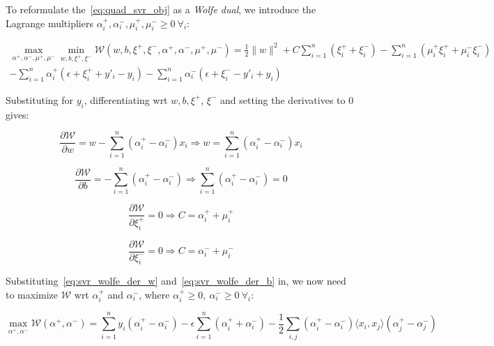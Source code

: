 To reformulate the~\eqref{eq:quad_svr_obj} as a \emph{Wolfe dual}, we introduce the Lagrange multipliers $\alpha_i^+, \alpha_i^-, \mu_i^+, \mu_i^- \geq 0 \ \forall_i$:

\begin{equation} \label{eq:svr_wolfe_dual}
	\begin{aligned}
    	\max_{\alpha^+,\alpha^-,\mu^+,\mu^-} \min_{w,b,\xi^+,\xi^-} \mathcal{W}(w,b,\xi^+,\xi^-,\alpha^+,\alpha^-,\mu^+,\mu^-) = \frac{1}{2} \| w \|^2 + C \sum_{i=1}^n (\xi_i^+ + \xi_i^-)-\sum_{i=1}^n (\mu_i^+ \xi_i^+ + \mu_i^- \xi_i^-) \\ -\sum_{i=1}^n \alpha_i^+(\epsilon+\xi_i^+ + y'_i-y_i)-\sum_{i=1}^n \alpha_i^-(\epsilon+\xi_i^- - y'_i+y_i)
	\end{aligned}
\end{equation}

Substituting for $y_i$, differentiating wrt $w, b, \xi^+$, $\xi^-$ and setting the derivatives to $0$ gives:

\begin{equation} \label{eq:svr_wolfe_der_w}
	\frac{\partial \mathcal{W}}{\partial w}=w-\sum_{i=1}^n (\alpha_i^+ - \alpha_i^-) x_i \Rightarrow w=\sum_{i=1}^n (\alpha_i^+ - \alpha_i^-) x_i
\end{equation}

\begin{equation} \label{eq:svr_wolfe_der_b}
	\frac{\partial \mathcal{W}}{\partial b}=-\sum_{i=1}^n (\alpha_i^+ - \alpha_i^-)\Rightarrow \sum_{i=1}^n (\alpha_i^+ - \alpha_i^-)=0
\end{equation}

\begin{equation}\label{eq:svr_wolfe_der_xip}
	\frac{\partial \mathcal{W}}{\partial\xi_i^+}=0\Rightarrow C=\alpha_i^+ + \mu_i^+
\end{equation}

\begin{equation} \label{eq:svr_wolfe_der_xim}
	\frac{\partial \mathcal{W}}{\partial\xi_i^-}=0\Rightarrow C=\alpha_i^- + \mu_i^-
\end{equation}

Substituting~\eqref{eq:svr_wolfe_der_w} and~\eqref{eq:svr_wolfe_der_b} in, we now need to maximize $\mathcal{W}$ wrt $\alpha_i^+$ and $\alpha_i^-$, where $\alpha_i^+ \geq 0,\ \alpha_i^- \geq 0 \ \forall_i$:

\begin{equation} \label{eq:svr_max_wolfe_dual}
    \max_{\alpha^+,\alpha^-} \mathcal{W}(\alpha^+,\alpha^-) = \sum_{i=1}^n y_i(\alpha_i^+ - \alpha_i^-)-\epsilon\sum_{i=1}^n (\alpha_i^+ + \alpha_i^-)-\frac{1}{2}\sum_{i,j}(\alpha_i^+ - \alpha_i^-)\langle x_i, x_j \rangle(\alpha_j ^+ - \alpha_j ^-)
\end{equation}

